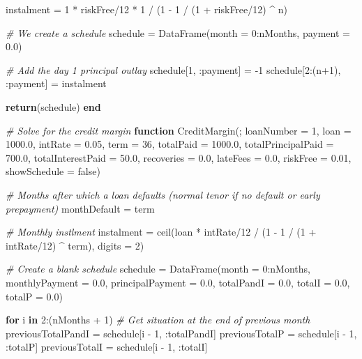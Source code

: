 \documentclass[11pt,]{report}
\newenvironment{Shaded}{\begin{snugshade}}{\end{snugshade}}
\newcommand{\CommentTok}[1]{\textcolor[rgb]{0.56,0.35,0.01}{\textit{#1}}}
\newcommand{\FloatTok}[1]{\textcolor[rgb]{0.00,0.00,0.81}{#1}}
\newcommand{\KeywordTok}[1]{\textcolor[rgb]{0.13,0.29,0.53}{\textbf{#1}}}
\newcommand{\NormalTok}[1]{#1}
\begin{document}
\begin{Shaded}
\begin{Highlighting}[numbers=left,,]
{{\NormalTok{  instalment = }\FloatTok{1}\NormalTok{ * riskFree/}\FloatTok{12}\NormalTok{ * }\FloatTok{1}\NormalTok{ / (}\FloatTok{1}\NormalTok{ - }\FloatTok{1}\NormalTok{ / (}\FloatTok{1}\NormalTok{ + riskFree/}\FloatTok{12}\NormalTok{) ^ n)}

  \CommentTok{# We create a schedule}
\NormalTok{  schedule = DataFrame(month = }\FloatTok{0}\NormalTok{:nMonths, payment = }\FloatTok{0.0}\NormalTok{)}

  \CommentTok{# Add the day 1 principal outlay}
\NormalTok{  schedule[}\FloatTok{1}\NormalTok{,       :payment] = -}\FloatTok{1}
\NormalTok{  schedule[}\FloatTok{2}\NormalTok{:(n+}\FloatTok{1}\NormalTok{), :payment] = instalment}

  \KeywordTok{return}\NormalTok{(schedule)}
\KeywordTok{end}


\CommentTok{# Solve for the credit margin}
\KeywordTok{function}\NormalTok{ CreditMargin(; loanNumber = }\FloatTok{1}\NormalTok{, loan = }\FloatTok{1000.0}\NormalTok{, intRate = }\FloatTok{0.05}\NormalTok{, term = }\FloatTok{36}\NormalTok{,}
\NormalTok{  totalPaid = }\FloatTok{1000.0}\NormalTok{, totalPrincipalPaid = }\FloatTok{700.0}\NormalTok{, totalInterestPaid = }\FloatTok{50.0}\NormalTok{,}
\NormalTok{  recoveries = }\FloatTok{0.0}\NormalTok{, lateFees = }\FloatTok{0.0}\NormalTok{,}
\NormalTok{  riskFree = }\FloatTok{0.01}\NormalTok{,}
\NormalTok{  showSchedule = false)}

  \CommentTok{# Months after which a loan defaults (normal tenor if no default or early prepayment)}
\NormalTok{  monthDefault = term}

  \CommentTok{# Monthly instlment}
\NormalTok{  instalment = ceil(loan * intRate/}\FloatTok{12}\NormalTok{ / (}\FloatTok{1}\NormalTok{ - }\FloatTok{1}\NormalTok{ / (}\FloatTok{1}\NormalTok{ + intRate/}\FloatTok{12}\NormalTok{) ^ term), digits = }\FloatTok{2}\NormalTok{)}

  \CommentTok{# Create a blank schedule}
\NormalTok{  schedule = DataFrame(month = }\FloatTok{0}\NormalTok{:nMonths, monthlyPayment = }\FloatTok{0.0}\NormalTok{,}
\NormalTok{                       principalPayment = }\FloatTok{0.0}\NormalTok{,}
\NormalTok{                       totalPandI = }\FloatTok{0.0}\NormalTok{, totalI = }\FloatTok{0.0}\NormalTok{, totalP = }\FloatTok{0.0}\NormalTok{)}

  \KeywordTok{for}\NormalTok{ i }\KeywordTok{in} \FloatTok{2}\NormalTok{:(nMonths + }\FloatTok{1}\NormalTok{)}
    \CommentTok{# Get situation at the end of previous month}
\NormalTok{    previousTotalPandI = schedule[i - }\FloatTok{1}\NormalTok{, :totalPandI]}
\NormalTok{    previousTotalP     = schedule[i - }\FloatTok{1}\NormalTok{, :totalP]}
\NormalTok{    previousTotalI     = schedule[i - }\FloatTok{1}\NormalTok{, :totalI]}

}}
\end{Highlighting}
\end{Shaded}
\end{document}
